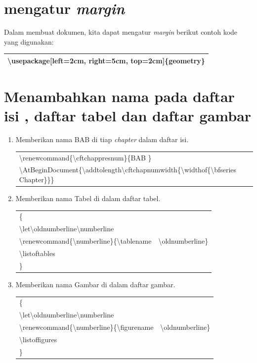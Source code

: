 \section{ mengatur {\itshape margin}}
Dalam membuat dokumen, kita dapat mengatur {\itshape margin} berikut contoh kode yang digunakan:\\[0.5 cm]
\begin{tabular}{|p{13.5 cm}|}
\hline
\textbackslash usepackage[left=2cm, right=5cm, top=2cm]\{geometry\}\\
\hline
\end{tabular}
\section{Menambahkan nama pada daftar isi , daftar tabel dan daftar gambar}
\begin{enumerate}
\item Memberikan nama BAB  di tiap {\itshape chapter} dalam daftar isi.\\
\begin{tabular}{|p{12.5 cm}|}
\hline
\textbackslash renewcommand\{\textbackslash cftchappresnum\}\{BAB  \} \\
\textbackslash AtBeginDocument\{\textbackslash addtolength\textbackslash cftchapnumwidth\{\textbackslash widthof\{\textbackslash bfseries Chapter\}\}\} \\
\hline
\end{tabular}
\item  Memberikan nama Tabel di  dalam daftar tabel.\\
\begin{tabular}{|p{12.5 cm}|}
\hline
\{ \\
\textbackslash let\textbackslash oldnumberline\textbackslash numberline \\
\textbackslash renewcommand\{\textbackslash numberline\}\{\textbackslash tablename~~\textbackslash oldnumberline\} \\
\textbackslash listoftables\\
\} \\
\hline
\end{tabular}
\item  Memberikan nama Gambar di dalam daftar gambar.\\
\begin{tabular}{|p{12.5 cm}|}
\hline
\{ \\
\textbackslash let\textbackslash oldnumberline\textbackslash numberline\\
\textbackslash renewcommand\{\textbackslash numberline\}\{\textbackslash figurename~~\textbackslash oldnumberline\} \\
\textbackslash listoffigures\\
\} \\
\hline
\end{tabular}
\end{enumerate}